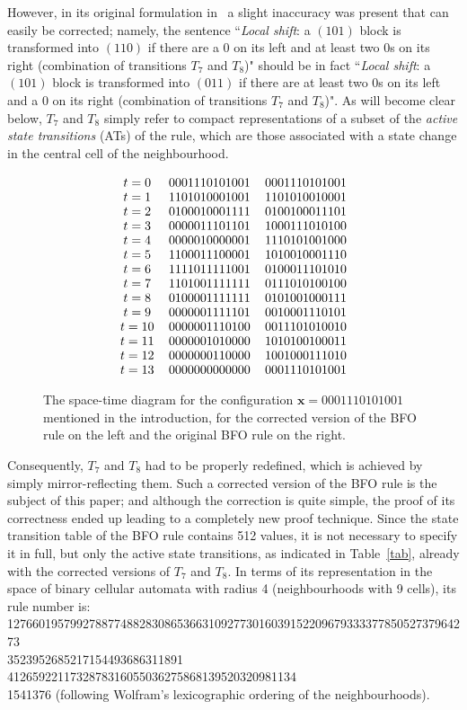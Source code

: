\documentclass{sn-jnl}
\newcommand{\bx}{\mathbf{x}}
\begin{document}
However, in its original formulation in~\cite{BFO2013} a slight inaccuracy was present that can easily be corrected; namely, the sentence ``{\it Local shift}: a $(101)$ block is transformed into $(110)$ if there are a 0 on its left and at least two 0s on its right (combination of transitions $T_7$ and $T_8$)" should be in fact ``{\it Local shift}: a $(101)$ block is transformed into $(011)$ if there are at least two 0s on its left and a 0 on its right (combination of transitions $T_7$ and $T_8$)". As will become clear below, $T_7$ and $T_8$ simply refer to compact representations of a subset of the \emph{active state transitions} (ATs) of the rule, which are those associated with a state change in the central cell of the neighbourhood.
\begin{figure}[h]
   \[
    \xymatrix@C=0.2cm@R=-0.03cm{ 
 t=0 &  0001110101001 & 0001110101001 \\
t=1 &  1101010001001 & 1101010010001\\
t=2 & 0100010001111 & 0100100011101 \\
t=3 &  0000011101101 & 1000111010100\\
t=4 & 0000010000001 & 1110101001000\\
t=5 & 1100011100001 & 1010010001110\\
t=6 &  1111011111001 & 0100011101010\\
t=7 & 1101001111111 & 0111010100100\\
t=8 & 0100001111111 & 0101001000111\\
t=9 &  0000001111101 & 0010001110101\\
t=10 &  0000001110100 & 0011101010010\\
t=11 & 0000001010000 & 1010100100011\\
t=12 &  0000000110000 & 1001000111010\\
t=13 &  0000000000000 & 0001110101001
}\]
    \caption{The space-time diagram for the configuration $\bx=0001110101001$ mentioned in the introduction, for the corrected version of the BFO rule on the left and the original BFO rule on the right.}
    \label{fig:ts-diagram}
\end{figure}

Consequently, $T_7$ and $T_8$ had to be properly redefined, which is achieved by simply mirror-reflecting them. Such a corrected version of the BFO rule is the subject of this paper; and although the correction is quite simple, the proof of its correctness ended up leading to a completely new proof technique. 
Since the state transition table of the BFO rule contains 512 values, it is not necessary to specify it in full, but only the active state transitions, as indicated in Table~\ref{tab}, already with the corrected versions of $T_7$ and $T_8$. In terms of its representation in the space of binary cellular automata with radius 4 (neighbourhoods with 9 cells), its rule number is: 12766019579927887748828308653663109277301603915220967933337785052737964273\\3523952685217154493686311891
4126592211732878316055036275868139520320981134\\1541376 (following Wolfram's lexicographic ordering of the neighbourhoods).
\end{document}
